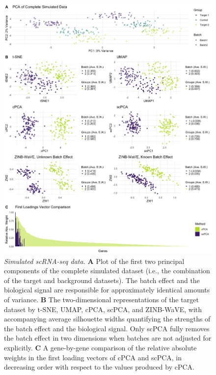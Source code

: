\begin{figure}[!htbp]
  \centering
  \includegraphics[width = \textwidth]{figures/sim_results.png}
  \caption{
  {\em Simulated scRNA-seq data.}
  \textbf{A} Plot of the first two principal components of the complete simulated dataset (i.e., the combination of the target and background datasets). The batch effect and the biological signal are responsible for approximately identical amounts of variance. \textbf{B} The two-dimensional representations of the target dataset by t-SNE, UMAP, cPCA, scPCA, and ZINB-WaVE, with accompanying average silhouette widths quantifying the strengths of the batch effect and the biological signal. Only scPCA fully removes the batch effect in two dimensions when batches are not adjusted for explicitly. \textbf{C} A gene-by-gene comparison of the relative absolute weights in the first loading vectors of cPCA and scPCA, in decreasing order with respect to the values produced by cPCA.}
  \label{fig:sim}
\end{figure}

